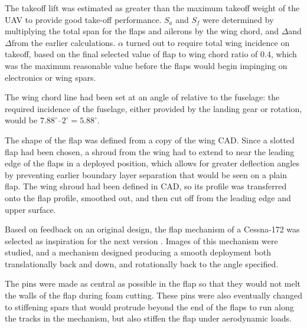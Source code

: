 \documentclass[../../main.tex]{subfiles}
\begin{document}
The takeoff lift was estimated as  greater than the maximum takeoff weight of the UAV to provide good take-off performance.
$S_a$ and $S_f$ were determined by multiplying the total span for the flaps and ailerons by the wing chord, and $\Delta$\cla and $\Delta$\clf from the earlier calculations.
$\alpha$ turned out to require  total wing incidence on takeoff, based on the final selected value of flap to wing chord ratio of 0.4, which was the maximum reasonable value before the flaps would begin impinging on electronics or wing spars.

The wing chord line had been set at an angle of  relative to the fuselage: the required incidence of the fuselage, either provided by the landing gear or rotation, would be $7.88^\circ – 2^\circ = 5.88^\circ$. 

The shape of the flap was defined from a copy of the wing CAD.
Since a slotted flap had been chosen, a shroud from the wing had to extend to near the leading edge of the flaps in a deployed position, which allows for greater deflection angles by preventing earlier boundary layer separation that would be seen on a plain flap.
The wing shroud had been defined in CAD, so its profile was transferred onto the flap profile, smoothed out, and then cut off from the leading edge and upper surface.  

Based on feedback on an original design, the flap mechanism of a Cessna-172 was selected as inspiration for the next version \cite{towell-19}.
Images of this mechanism were studied, and a mechanism designed producing a smooth deployment both translationally back and down, and rotationally back to the  angle specified. 


The pins were made as central as possible in the flap so that they would not melt the walls of the flap during foam cutting.
These pins were also eventually changed to stiffening spars that would protrude beyond the end of the flaps to run along the tracks in the mechanism, but also stiffen the flap under aerodynamic loads.

\end{document}
